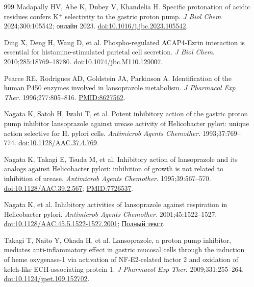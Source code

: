 \documentclass[11pt,a4paper,notitlepage]{report}
\begin{document}
\begin{thebibliography}{999}
 Madapally HV, Abe K, Dubey V, Khandelia H. Specific protonation of acidic residues confers K$^+$ selectivity to the gastric proton pump. \textit{J Biol Chem}. 2024;300:105542; онлайн 2023. \href{https://doi.org/10.1016/j.jbc.2023.105542}{doi:10.1016/j.jbc.2023.105542}.

 Ding X, Deng H, Wang D, et al. Phospho-regulated ACAP4-Ezrin interaction is essential for histamine-stimulated parietal cell secretion. \textit{J Biol Chem}. 2010;285:18769--18780. \href{https://doi.org/10.1074/jbc.M110.129007}{doi:10.1074/jbc.M110.129007}.

 Pearce RE, Rodrigues AD, Goldstein JA, Parkinson A. Identification of the human P450 enzymes involved in lansoprazole metabolism. \textit{J Pharmacol Exp Ther}. 1996;277:805--816. \href{https://pubmed.ncbi.nlm.nih.gov/8627562/}{PMID:8627562}.

 Nagata K, Satoh H, Iwahi T, et al. Potent inhibitory action of the gastric proton pump inhibitor lansoprazole against urease activity of Helicobacter pylori: unique action selective for H. pylori cells. \textit{Antimicrob Agents Chemother}. 1993;37:769--774. \href{https://doi.org/10.1128/AAC.37.4.769}{doi:10.1128/AAC.37.4.769}.

 Nagata K, Takagi E, Tsuda M, et al. Inhibitory action of lansoprazole and its analogs against Helicobacter pylori: inhibition of growth is not related to inhibition of urease. \textit{Antimicrob Agents Chemother}. 1995;39:567--570. \href{https://doi.org/10.1128/AAC.39.2.567}{doi:10.1128/AAC.39.2.567}; \href{https://pubmed.ncbi.nlm.nih.gov/7726537/}{PMID:7726537}.

 Nagata K, et al. Inhibitory activities of lansoprazole against respiration in Helicobacter pylori. \textit{Antimicrob Agents Chemother}. 2001;45:1522--1527. \href{https://doi.org/10.1128/AAC.45.5.1522-1527.2001}{doi:10.1128/AAC.45.5.1522-1527.2001}; \href{https://pmc.ncbi.nlm.nih.gov/articles/PMC90499/}{Полный текст}.

 Takagi T, Naito Y, Okada H, et al. Lansoprazole, a proton pump inhibitor, mediates anti-inflammatory effect in gastric mucosal cells through the induction of heme oxygenase-1 via activation of NF-E2-related factor 2 and oxidation of kelch-like ECH-associating protein 1. \textit{J Pharmacol Exp Ther}. 2009;331:255--264. \href{https://doi.org/10.1124/jpet.109.152702}{doi:10.1124/jpet.109.152702}.


\end{thebibliography}
\end{document}
